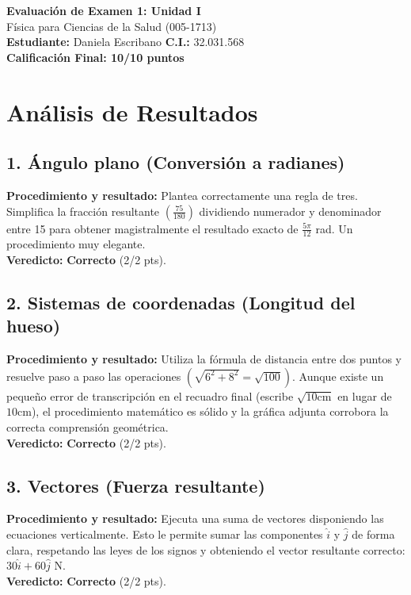 \documentclass[12pt]{article}
\begin{document}
\begin{center}
    \Large \textbf{Evaluación de Examen 1: Unidad I} \\
    \large Física para Ciencias de la Salud (005-1713) \\
    \vspace{0.5cm}
    \textbf{Estudiante:} Daniela Escribano \quad \textbf{C.I.:} 32.031.568
    \vspace{0.3cm} \\
    \large \textbf{Calificación Final: 10/10 puntos}
\end{center}

\vspace{0.5cm}

\section*{Análisis de Resultados}

\subsection*{1. Ángulo plano (Conversión a radianes)}
\textbf{Procedimiento y resultado:} Plantea correctamente una regla de tres. Simplifica la fracción resultante $\left(\frac{75}{180}\right)$ dividiendo numerador y denominador entre 15 para obtener magistralmente el resultado exacto de $\frac{5\pi}{12}$ rad. Un procedimiento muy elegante. \\
\textbf{Veredicto:} \textbf{Correcto} (2/2 pts).

\subsection*{2. Sistemas de coordenadas (Longitud del hueso)}
\textbf{Procedimiento y resultado:} Utiliza la fórmula de distancia entre dos puntos y resuelve paso a paso las operaciones $\left(\sqrt{6^2 + 8^2} = \sqrt{100}\right)$. Aunque existe un pequeño error de transcripción en el recuadro final (escribe $\sqrt{10\text{cm}}$ en lugar de $10\text{cm}$), el procedimiento matemático es sólido y la gráfica adjunta corrobora la correcta comprensión geométrica. \\
\textbf{Veredicto:} \textbf{Correcto} (2/2 pts).

\subsection*{3. Vectores (Fuerza resultante)}
\textbf{Procedimiento y resultado:} Ejecuta una suma de vectores disponiendo las ecuaciones verticalmente. Esto le permite sumar las componentes $\hat{i}$ y $\hat{j}$ de forma clara, respetando las leyes de los signos y obteniendo el vector resultante correcto: $30\hat{i} + 60\hat{j}$ N. \\
\textbf{Veredicto:} \textbf{Correcto} (2/2 pts).
\end{document}
